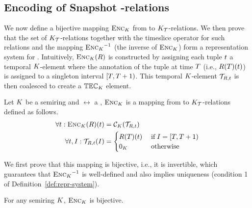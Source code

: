 \subsection{Encoding of Snapshot \semK-relations}
\label{sec:encod-snapsh-semk}

We now define a bijective mapping $\textsc{Enc}_{K}$ from \SKrels{} to $K_{\mathcal{T}}$-relations. We then prove that the set of $K_{\mathcal{T}}$-relations together with the timeslice operator for such relations and the mapping ${{\textsc{Enc}_{K}}^{-1}}$ (the inverse of $\textsc{Enc}_{K}$) form a representation system for \SKrels{}. Intuitively, $\textsc{Enc}_{K}(R)$ is constructed by assigning each tuple $t$ a  temporal $K$-element where the annotation of the tuple at time $T$ (i.e., $R(T)(t)$) is assigned to a singleton interval $[T,T+1)$. This temporal $K$-element $\mathcal{T}_{R,t}$ is then coalesced to create a $\mathbb{TEC}_{{K}}$ element.

\begin{defi}\label{def:snapshot-K-relation-encoding}
  Let $K$ be a semiring and $\rel$ a \SKrel{},
  $\textsc{Enc}_{K}$ is a mapping from \SKrels{} to
  $K_{\mathcal{T}}$-relations defined as follows.
  \begin{align*}
\forall t:  \textsc{Enc}_{K}(R)(t) &= \mathcal{C}_{{K}}(\mathcal{T}_{R,t})\\
\forall t, I: \mathcal{T}_{R,t}(I) &=
    \begin{cases}
      R(T)(t) &\thickspace\text{if}\thickspace I = [T,T+1)\\
      0_K &\thickspace\text{otherwise}\thickspace
    \end{cases}
  \end{align*}
\end{defi}

We first prove that this mapping is bijective, i.e., it is invertible,
which guarantees that ${{\textsc{Enc}_{K}}^{-1}}$ is well-defined and also implies uniqueness (condition 1 of
Definition~\ref{def:repr-system}).

\begin{lem}\label{lem:encoding-is-bijective}
For any semiring $K$,  $\textsc{Enc}_{K}$ is bijective.
\end{lem}


